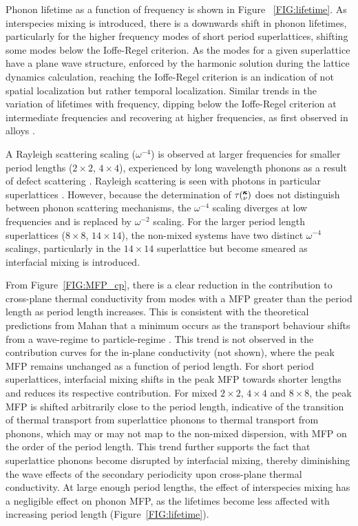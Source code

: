\documentclass[aps,prb,preprint,preprintnumbers,amsmath,amssymb,floatfix,superscriptaddress]{revtex4}
\newcommand{\kv}{\mspace{-4.0mu}\left(\mspace{-8.0mu}
\begin{smallmatrix}&\pmb{\kappa} \\&\nu\end{smallmatrix}
\mspace{-3.0mu}\right)}
\begin{document}
Phonon lifetime as a function of frequency is shown in Figure ~\ref{FIG:lifetime}. As interspecies mixing is introduced, there is a downwards shift in phonon lifetimes, particularly for the higher frequency modes of short period superlattices, shifting some modes below the Ioffe-Regel criterion. As the modes for a given superlattice have a plane wave structure, enforced by the harmonic solution during the lattice dynamics calculation, reaching the Ioffe-Regel criterion is an indication of not spatial localization but rather temporal localization. Similar trends in the variation of lifetimes with frequency, dipping below the Ioffe-Regel criterion at intermediate frequencies and recovering at higher frequencies, as first observed in alloys \cite{jason2013vc}.

A Rayleigh scattering scaling ($\omega^{-4}$) is observed at larger frequencies for smaller period lengths ($2\times2$, $4\times4$), experienced by long wavelength phonons as a result of defect scattering \cite{PhysRev.140.A1812,klemens_scattering_1955-3,klemens_thermal_1957-2}. Rayleigh scattering is seen with photons in particular superlattices \cite{PhysRevLett.58.2486}. However, because the determination of $\tau\kv$ does not distinguish between phonon scattering mechanisms, the $\omega^{-4}$ scaling diverges at low frequencies and is replaced by $\omega^{-2}$ scaling. For the larger period length superlattices ($8\times8$, $14\times14$), the non-mixed systems have two distinct $\omega^{-4}$ scalings, particularly in the $14\times14$ superlattice but become smeared as interfacial mixing is introduced.

From Figure~\ref{FIG:MFP_cp}, there is a clear reduction in the contribution to cross-plane thermal conductivity from modes with a MFP greater than the period length as period length increases. This is consistent with the theoretical predictions from Mahan that a minimum occurs as the transport behaviour shifts from a wave-regime to particle-regime \cite{PhysRevLett.84.927,PhysRevB.56.10754}. This trend is not observed in the contribution curves for the in-plane conductivity (not shown), where the peak MFP remains unchanged as a function of period length. For short period superlattices, interfacial mixing shifts in the peak MFP towards shorter lengths and reduces its respective contribution. For mixed $2\times2$, $4\times4$ and $8\times8$, the peak MFP is shifted arbitrarily close to the period length, indicative of the transition of thermal transport from superlattice phonons to thermal transport from phonons, which may or may not map to the non-mixed dispersion, with MFP on the order of the period length. This trend further supports the fact that superlattice phonons become disrupted by interfacial mixing, thereby diminishing the wave effects of the secondary periodicity upon cross-plane thermal conductivity. At large enough period lengths, the effect of interspecies mixing has a negligible effect on phonon MFP, as the lifetimes become less affected with increasing period length (Figure~\ref{FIG:lifetime}).
\end{document}
